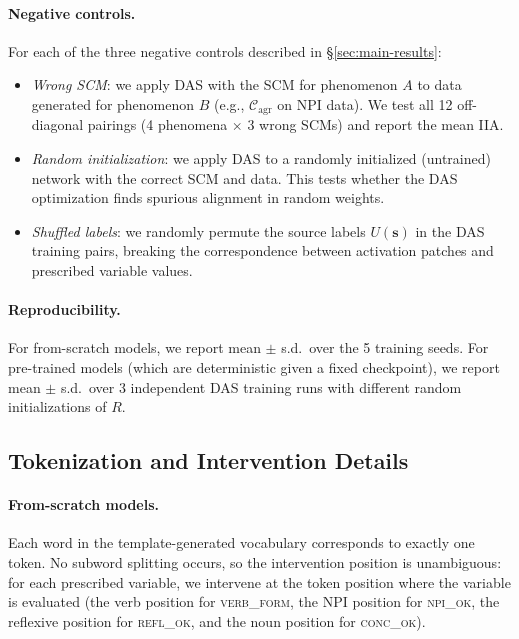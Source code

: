 \documentclass[11pt]{article}
\begin{document}
\paragraph{Negative controls.}
For each of the three negative controls described in \S\ref{sec:main-results}:
\begin{itemize}[itemsep=2pt,leftmargin=*]
    \item \textit{Wrong SCM}: we apply DAS with the SCM for phenomenon $A$ to data generated for phenomenon $B$ (e.g., $\mathcal{C}_\text{agr}$ on NPI data). We test all 12 off-diagonal pairings (4 phenomena $\times$ 3 wrong SCMs) and report the mean IIA.
    \item \textit{Random initialization}: we apply DAS to a randomly initialized (untrained) network with the correct SCM and data. This tests whether the DAS optimization finds spurious alignment in random weights.
    \item \textit{Shuffled labels}: we randomly permute the source labels $U(\mathbf{s})$ in the DAS training pairs, breaking the correspondence between activation patches and prescribed variable values.
\end{itemize}

\paragraph{Reproducibility.}
For from-scratch models, we report mean $\pm$ s.d.\ over the 5 training seeds.
For pre-trained models (which are deterministic given a fixed checkpoint), we report mean $\pm$ s.d.\ over 3 independent DAS training runs with different random initializations of $R$.

\subsection{Tokenization and Intervention Details}
\label{app:tokenization}

\paragraph{From-scratch models.}
Each word in the template-generated vocabulary corresponds to exactly one token.
No subword splitting occurs, so the intervention position is unambiguous: for each prescribed variable, we intervene at the token position where the variable is evaluated (the verb position for \textsc{verb\_form}, the NPI position for \textsc{npi\_ok}, the reflexive position for \textsc{refl\_ok}, and the noun position for \textsc{conc\_ok}).
\end{document}
